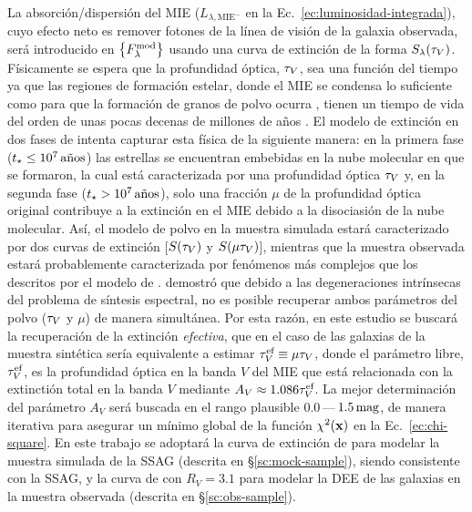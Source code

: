 La absorción/dispersión del MIE ($L_{\lambda,\text{MIE}^-}$ en la
Ec.~\ref{ec:luminosidad-integrada}), cuyo efecto neto es remover fotones de la línea de visión de la
galaxia observada, será introducido en $\set{\sedt[F]{mod}}$ usando una curva de extinción de la
forma $S_\lambda(\tauv)$. Físicamente se espera que la profundidad óptica, $\tauv$, sea una función
del tiempo ya que las regiones de formación estelar, donde el MIE se condensa lo suficiente como
para que la formación de granos de polvo ocurra \citep{Draine2009}, tienen un tiempo de vida del
orden de unas pocas decenas de millones de años \citep[véase,][para una revisión]{Lada2003}. El
modelo de extinción en dos fases de \citet{Charlot2000} intenta capturar esta física de la siguiente
manera: en la primera fase ($t_\star\leq\unit[10^7]{años}$) las estrellas se encuentran embebidas en
la nube molecular en que se formaron, la cual está caracterizada por una profundidad óptica $\tauv$
y, en la segunda fase ($t_\star>\unit[10^7]{años}$), solo una fracción $\mu$ de la profundidad
óptica original contribuye a la extinción en el MIE debido a la disociasión de la nube molecular.
Así, el modelo de polvo en la muestra simulada estará caracterizado por dos curvas de extinción
[$S(\tauv)$ y $S(\mu\tauv)$], mientras que la muestra observada estará probablemente caracterizada
por fenómenos más complejos que los descritos por el modelo de \citet{Charlot2000}.
\citet{Tojeiro2007} demostró que debido a las degeneraciones intrínsecas del problema de síntesis
espectral, no es posible recuperar ambos parámetros del polvo ($\tauv$ y $\mu$) de manera
simultánea. Por esta razón, en este estudio se buscará la recuperación de la extinción
\emph{efectiva}, que en el caso de las galaxias de la muestra sintética sería equivalente a estimar
$\tauv^\text{ef}\equiv\mu\tauv$, donde el parámetro libre, $\tauv^\text{ef}$, es la profundidad
óptica en la banda $V$ del MIE que está relacionada con la extinctión total en la banda $V$ mediante
$A_V\approx1.086\tauv^\text{ef}$. La mejor determinación del parámetro $A_V$ será buscada en el
rango plausible $0.0\,$---$\,\unit[1.5]{mag}$, de manera iterativa para asegurar un mínimo global de
la función $\chi^2(\hip)$ en la Ec.~\eqref{ec:chi-square}. En este trabajo se adoptará la curva de
extinción de \citet{Charlot2000} para modelar la muestra simulada de la SSAG (descrita en
\S\ref{sc:mock-sample}), siendo consistente con la SSAG, y la curva de \citet{Cardelli1989} con
$R_V=3.1$ para modelar la DEE de las galaxias en la muestra observada (descrita en
\S\ref{sc:obs-sample}).


